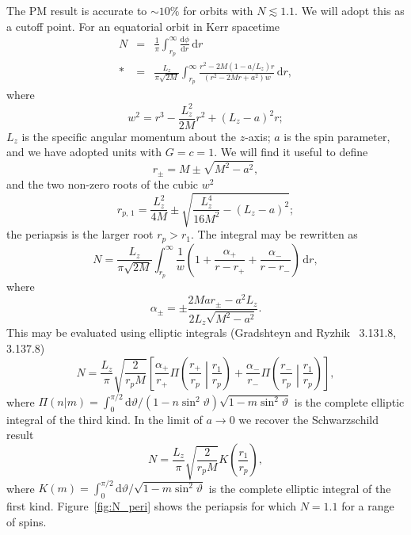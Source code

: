 \documentclass[aps,prd,amsfonts,amssymb,amsmath,nofootinbib,floatfix,reprint,showpacs,groupedaddress]{revtex4-1}
\newcommand{\Figref}[1]{Figure~\ref{fig:#1}}
\newcommand{\dd}{\ensuremath{\mathrm{d}}}
\newcommand{\diff}[2]{\ensuremath{\frac{\dd {#1}}{\dd {#2}}}}
\newcommand{\intd}[4]{\ensuremath{\int_{#1}^{#2}{#3}\,\dd{#4}}}
\newcommand{\recip}[1]{\ensuremath{\frac{1}{#1}}}
\begin{document}
The PM result is accurate to $\sim 10\%$ for orbits with $N \lesssim 1.1$. We will adopt this as a cutoff point. For an equatorial orbit in Kerr spacetime
\begin{eqnarray}
N & = & \recip{\pi}\intd{r_{p}}{\infty}{\diff{\phi}{r}}{r} \nonumber \\*
 & = & \frac{L_z}{\pi\sqrt{2M}}\intd{r_{p}}{\infty}{\frac{r^2 - 2M(1 - a/L_z)r}{(r^2 - 2Mr + a^2)w}}{r},
\end{eqnarray}
where
\begin{equation}
w^2 = r^3 - \frac{L_z^2}{2M}r^2 + (L_z - a)^2r;
\end{equation}
$L_z$ is the specific angular momentum about the $z$-axis; $a$ is the spin parameter, and we have adopted units with $G = c = 1$. We will find it useful to define
\begin{equation}
r_\pm = M \pm \sqrt{M^2 - a^2},
\end{equation}
and the two non-zero roots of the cubic $w^2$
\begin{equation}
r_{p,\,1} = \frac{L_z^2}{4M} \pm \sqrt{\frac{L_z^4}{16M^2} - (L_z -a)^2};
\end{equation}
the periapsis is the larger root $r_{p} > r_1$. The integral may be rewritten as
\begin{equation}
N = \frac{L_z}{\pi\sqrt{2M}}\intd{r_{p}}{\infty}{\recip{w}\left(1 + \frac{\alpha_+}{r-r_+} + \frac{\alpha_-}{r-r_-}\right)}{r},
\end{equation}
where
\begin{equation}
\alpha_\pm = \pm\frac{2Mar_\pm - a^2L_z}{2L_z\sqrt{M^2-a^2}}.
\end{equation}
This may be evaluated using elliptic integrals (Gradshteyn and Ryzhik~\cite{Gradshteyn2000} 3.131.8, 3.137.8)
\begin{equation}
N = \frac{L_z}{\pi}\sqrt{\frac{2}{r_{p}M}}\left[\frac{\alpha_+}{r_+}\Pi\left(\frac{r_+}{r_{p}}\middle|\frac{r_1}{r_{p}}\right) + \frac{\alpha_-}{r_-}\Pi\left(\frac{r_-}{r_{p}}\middle|\frac{r_1}{r_{p}}\right)\right],
\end{equation}
where $\Pi(n|m) = \int_{0}^{\pi/2}{\dd\vartheta/(1-n\sin^2\vartheta)\sqrt{1-m\sin^2\vartheta}}$ is the complete elliptic integral of the third kind. In the limit of $a \rightarrow 0$ we recover the Schwarzschild result~\cite{Cutler1994}
\begin{equation}
N = \frac{L_z}{\pi}\sqrt{\frac{2}{r_{p}M}}K\left(\frac{r_1}{r_{p}}\right),
\end{equation}
where $K(m) = \int_{0}^{\pi/2}{\dd\vartheta/\sqrt{1-m\sin^2\vartheta}}$ is the complete elliptic integral of the first kind. \Figref{N_peri} shows the periapsis for which $N = 1.1$ for a range of spins.
\end{document}
